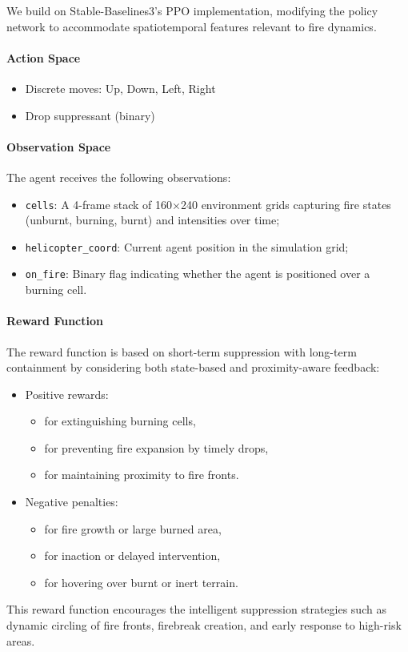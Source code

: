\documentclass[conference]{IEEEtran}
\begin{document}
We build on Stable-Baselines3’s \cite{stable-baselines3} PPO implementation, modifying the policy network to accommodate spatiotemporal features relevant to fire dynamics.

\paragraph{Action Space}
\begin{itemize}
    \item Discrete moves: Up, Down, Left, Right
    \item Drop suppressant (binary)
\end{itemize}

\paragraph{Observation Space}
The agent receives the following observations:

\begin{itemize}
    \item \texttt{cells}: A 4-frame stack of 160\(\times\)240 environment grids capturing fire states (unburnt, burning, burnt) and intensities over time;
    \item \texttt{helicopter\_coord}: Current agent position in the simulation grid;
    \item \texttt{on\_fire}: Binary flag indicating whether the agent is positioned over a burning cell.
\end{itemize}

\paragraph{Reward Function}
The reward function is based on short-term suppression with long-term containment by considering both state-based and proximity-aware feedback:
\begin{itemize}
    \item Positive rewards: 
        \begin{itemize}
            \item for extinguishing burning cells,
            \item for preventing fire expansion by timely drops,
            \item for maintaining proximity to fire fronts.
        \end{itemize}
    \item Negative penalties:
        \begin{itemize}
            \item for fire growth or large burned area,
            \item for inaction or delayed intervention,
            \item for hovering over burnt or inert terrain.
        \end{itemize}
\end{itemize}
This reward function encourages the intelligent suppression strategies such as dynamic circling of fire fronts, firebreak creation, and early response to high-risk areas.
\end{document}
